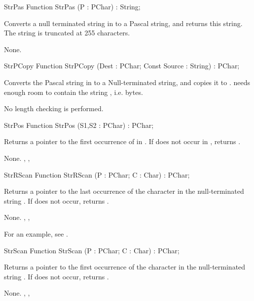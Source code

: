 \html{}
\begin{function}{StrPas}
\Declaration
Function StrPas (P : PChar) : String;

\Description

Converts a null terminated string in  to a Pascal string, and returns
this string. The string is truncated at 255 characters.

\Errors
None.
\SeeAlso
\end{function}
\html{}
\begin{function}{StrPCopy}
\Declaration
Function StrPCopy (Dest : PChar; Const Source : String) : PChar;

\Description

Converts the Pascal string in  to a Null-terminated 
string, and copies it to .  needs enough room to contain
the string , i.e.  bytes.

\Errors
No length checking is performed.
\SeeAlso
\end{function}
\html{}
\begin{function}{StrPos}
\Declaration
Function StrPos (S1,S2 : PChar) : PChar;

\Description

Returns a pointer to the first occurrence of  in .
If  does not occur in , returns .

\Errors
None.
\SeeAlso
{}, , 
\end{function}
\html{}
\begin{function}{StrRScan}
\Declaration
Function StrRScan (P : PChar; C : Char) : PChar;

\Description

Returns a pointer to the last occurrence of the character  in the
null-terminated string . If  does not occur, returns
.

\Errors
None.
\SeeAlso
{}, , 
\end{function}
For an example, see .
\begin{function}{StrScan}
\Declaration
Function StrScan (P : PChar; C : Char) : PChar;

\Description

Returns a pointer to the first occurrence of the character  in the
null-terminated string . If  does not occur, returns
.

\Errors
None.
\SeeAlso
{}, , 
\end{function}
